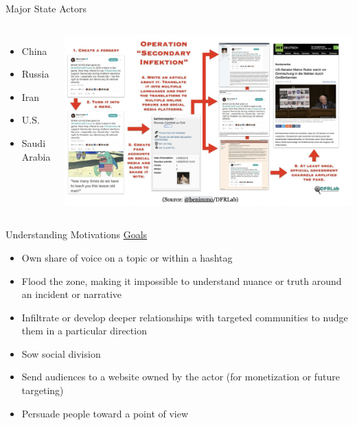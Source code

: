 \documentclass[nobackground,dvipsnames,table,aspectratio=169]{beamer}
\begin{document}
\begin{frame}{Major State Actors}
    \begin{columns}
            \begin{itemize}
                \item China
                \item Russia
                \item Iran
                \item U.S.
                \item Saudi Arabia
            \end{itemize}
            \includegraphics[width=\textwidth]{operation-secondary-infektion}
    \end{columns}
\end{frame}

\begin{frame}{Understanding Motivations}
    \underline{Goals}
    \begin{itemize}
        \item Own share of voice on a topic or within a hashtag
        \item Flood the zone, making it impossible to understand nuance or truth around an incident or narrative
        \item Infiltrate or develop deeper relationships with targeted communities to nudge them in a particular direction
        \item Sow social division
        \item Send audiences to a website owned by the actor (for monetization or future targeting)
        \item Persuade people toward a point of view
    \end{itemize}
\end{frame}
\end{document}
